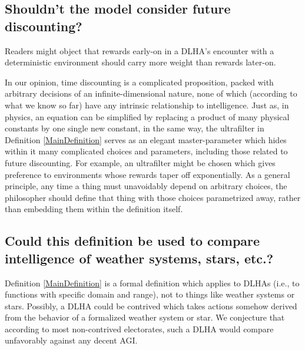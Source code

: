\documentclass[twoside,11pt]{article}
\begin{document}
\subsection{Shouldn't the model consider future discounting?}

Readers might object that rewards early-on in a DLHA's encounter with a deterministic
environment should carry more weight than rewards later-on.

In our opinion, time discounting is a complicated proposition, packed with
arbitrary decisions of an infinite-dimensional nature, none of which (according to what
we know so far) have any intrinsic relationship to intelligence.
Just as, in physics, an equation can be simplified by replacing a product of
many physical constants by one single new constant, in the same way,
the ultrafilter in Definition \ref{MainDefinition} serves as an elegant master-parameter
which hides within it many complicated choices and parameters, including those
related to future discounting. For example, an ultrafilter might be chosen which
gives preference to environments whose rewards taper off exponentially.
As a general principle, any time a thing must unavoidably depend on arbitrary
choices, the philosopher should define that thing with those choices parametrized away,
rather than embedding them within the definition itself.

\subsection{Could this definition be used to compare intelligence of weather systems,
stars, etc.?}

Definition \ref{MainDefinition} is a formal definition which applies to
DLHAs (i.e., to functions with specific domain and range), not to things like
weather systems or stars. Possibly, a DLHA could be contrived which takes
actions somehow derived from the behavior of a formalized weather system or star.
We conjecture that according to most non-contrived electorates, such a DLHA
would compare unfavorably against any decent AGI.
\end{document}
